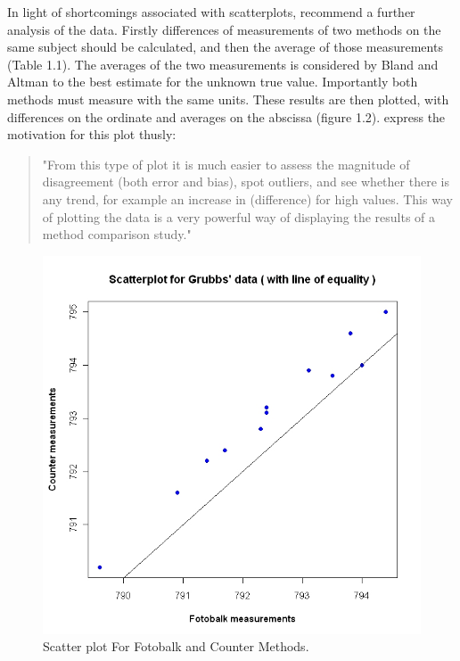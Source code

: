 \documentclass[12pt, a4paper]{report}
\begin{document}
	
	
	In light of shortcomings associated with scatterplots,
	\citet*{BA83} recommend a further analysis of the data. Firstly
	differences of measurements of two methods on the same subject
	should  be calculated, and then the average of those measurements
	(Table 1.1). The averages of the two measurements is considered by
	Bland and Altman to the best estimate for the unknown true value.
	Importantly both methods must measure with the same units. These
	results are then plotted, with differences on the ordinate and
	averages on the abscissa (figure 1.2). \citet*{BA83}express the
	motivation for this plot thusly:
	\begin{quote}
		"From this type of plot it is much easier to assess the magnitude
		of disagreement (both error and bias), spot outliers, and see
		whether there is any trend, for example an increase in
		(difference) for high values. This way of plotting the data is a
		very powerful way of displaying the results of a method comparison
		study."
	\end{quote}
		
	\begin{figure}[h!]
		\begin{center}
			\includegraphics[width=130mm]{images/GrubbsScatter.jpeg}
			\caption{Scatter plot For Fotobalk and Counter Methods.}\label{GrubbsScatter}
		\end{center}
	\end{figure}
	
\end{document}
